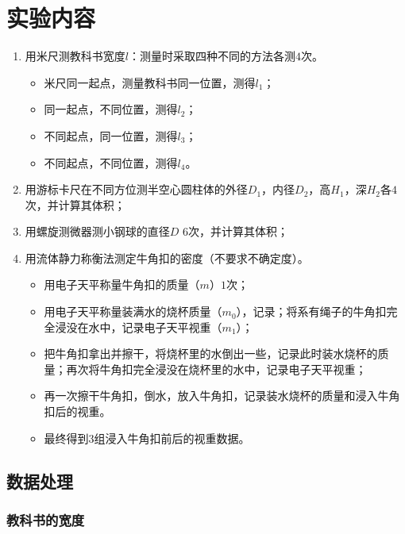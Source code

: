 \documentclass[12pt,a4paper]{article}
\begin{document}
	
	\section{实验内容}
	\begin{enumerate}
		\item 用米尺测教科书宽度$l$：测量时采取四种不同的方法各测$4$次。
		\begin{itemize}
			\item[(1)] 米尺同一起点，测量教科书同一位置，测得$l_1$；
			\item[(2)] 同一起点，不同位置，测得$l_2$；
			\item[(3)] 不同起点，同一位置，测得$l_3$；
			\item[(4)] 不同起点，不同位置，测得$l_4$。
		\end{itemize}
		\item 用游标卡尺在不同方位测半空心圆柱体的外径$D_1$，内径$D_2$，高$H_1$，深$H_2$各$4$次，并计算其体积；
		\item 用螺旋测微器测小钢球的直径$D$ $6$次，并计算其体积；
		
		\item 用流体静力称衡法测定牛角扣的密度（不要求不确定度）。
		\begin{itemize}
			\item[(1)] 用电子天平称量牛角扣的质量（$m$）$1$次；
			\item[(2)] 用电子天平称量装满水的烧杯质量（$m_0$），记录；将系有绳子的牛角扣完全浸没在水中，记录电子天平视重（$m_1$）；
			\item[(3)] 把牛角扣拿出并擦干，将烧杯里的水倒出一些，记录此时装水烧杯的质量；再次将牛角扣完全浸没在烧杯里的水中，记录电子天平视重；
			\item[(4)] 再一次擦干牛角扣，倒水，放入牛角扣，记录装水烧杯的质量和浸入牛角扣后的视重。
			\item[(5)] 最终得到$3$组浸入牛角扣前后的视重数据。
		\end{itemize}
	\end{enumerate}
	
	\subsection{数据处理}
	\subsubsection*{教科书的宽度}
\end{document}
